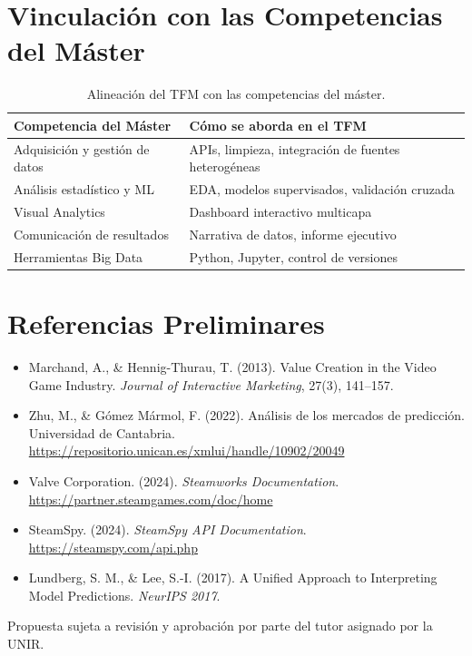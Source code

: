 \documentclass[12pt, a4paper]{article}
\begin{document}
\section{Vinculaci\'on con las Competencias del M\'aster}

\begin{table}[h!]
\centering
\renewcommand{\arraystretch}{1.4}
\begin{tabular}{p{5.5cm} p{7cm}}
\toprule
\textbf{Competencia del M\'aster} & \textbf{C\'omo se aborda en el TFM} \\
\midrule
Adquisici\'on y gesti\'on de datos & APIs, limpieza, integraci\'on de fuentes heterog\'eneas \\
An\'alisis estad\'istico y ML       & EDA, modelos supervisados, validaci\'on cruzada \\
Visual Analytics                & Dashboard interactivo multicapa \\
Comunicaci\'on de resultados      & Narrativa de datos, informe ejecutivo \\
Herramientas Big Data           & Python, Jupyter, control de versiones \\
\bottomrule
\end{tabular}
\caption{Alineaci\'on del TFM con las competencias del m\'aster.}
\end{table}

\section{Referencias Preliminares}

\begin{itemize}
  \item Marchand, A., \& Hennig-Thurau, T. (2013). Value Creation in the Video Game Industry. \textit{Journal of Interactive Marketing}, 27(3), 141--157.
  \item Zhu, M., \& G\'omez M\'armol, F. (2022). An\'alisis de los mercados de predicci\'on. Universidad de Cantabria. \url{https://repositorio.unican.es/xmlui/handle/10902/20049}
  \item Valve Corporation. (2024). \textit{Steamworks Documentation}. \url{https://partner.steamgames.com/doc/home}
  \item SteamSpy. (2024). \textit{SteamSpy API Documentation}. \url{https://steamspy.com/api.php}
  \item Lundberg, S. M., \& Lee, S.-I. (2017). A Unified Approach to Interpreting Model Predictions. \textit{NeurIPS 2017}.
\end{itemize}

\vfill
\begin{center}
{\small\color{gray} Propuesta sujeta a revisi\'on y aprobaci\'on por parte del tutor asignado por la UNIR.}
\end{center}
\end{document}
